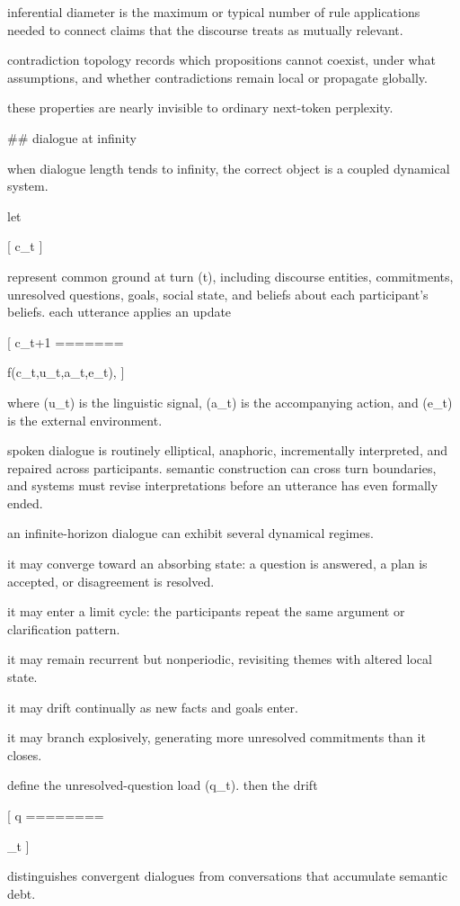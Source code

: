 inferential diameter is the maximum or typical number of rule applications needed to connect claims that the discourse treats as mutually relevant.

contradiction topology records which propositions cannot coexist, under what assumptions, and whether contradictions remain local or propagate globally.

these properties are nearly invisible to ordinary next-token perplexity.

## dialogue at infinity

when dialogue length tends to infinity, the correct object is a coupled dynamical system.

let

[
c_t
]

represent common ground at turn (t), including discourse entities, commitments, unresolved questions, goals, social state, and beliefs about each participant’s beliefs. each utterance applies an update

[
c_{t+1}
=======

f(c_t,u_t,a_t,e_t),
]

where (u_t) is the linguistic signal, (a_t) is the accompanying action, and (e_t) is the external environment.

spoken dialogue is routinely elliptical, anaphoric, incrementally interpreted, and repaired across participants. semantic construction can cross turn boundaries, and systems must revise interpretations before an utterance has even formally ended.

an infinite-horizon dialogue can exhibit several dynamical regimes.

it may converge toward an absorbing state: a question is answered, a plan is accepted, or disagreement is resolved.

it may enter a limit cycle: the participants repeat the same argument or clarification pattern.

it may remain recurrent but nonperiodic, revisiting themes with altered local state.

it may drift continually as new facts and goals enter.

it may branch explosively, generating more unresolved commitments than it closes.

define the unresolved-question load (q_t). then the drift

[
\Delta q
========

\lim_{t\to\infty}
]

distinguishes convergent dialogues from conversations that accumulate semantic debt.

